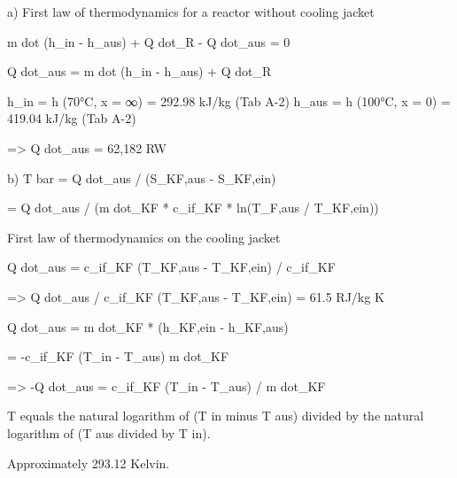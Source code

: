 a) First law of thermodynamics for a reactor without cooling jacket

m dot (h_in - h_aus) + Q dot_R - Q dot_aus = 0

Q dot_aus = m dot (h_in - h_aus) + Q dot_R

h_in = h (70°C, x = ∞) = 292.98 kJ/kg (Tab A-2)
h_aus = h (100°C, x = 0) = 419.04 kJ/kg (Tab A-2)

=> Q dot_aus = 62,182 RW

b) T bar = Q dot_aus / (S_KF,aus - S_KF,ein)

= Q dot_aus / (m dot_KF * c_if_KF * ln(T_F,aus / T_KF,ein))

First law of thermodynamics on the cooling jacket

Q dot_aus = c_if_KF (T_KF,aus - T_KF,ein) / c_if_KF

=> Q dot_aus / c_if_KF (T_KF,aus - T_KF,ein) = 61.5 RJ/kg K

Q dot_aus = m dot_KF * (h_KF,ein - h_KF,aus)

= -c_if_KF (T_in - T_aus) m dot_KF

=> -Q dot_aus = c_if_KF (T_in - T_aus) / m dot_KF

T equals the natural logarithm of (T in minus T aus) divided by the natural logarithm of (T aus divided by T in).

Approximately 293.12 Kelvin.